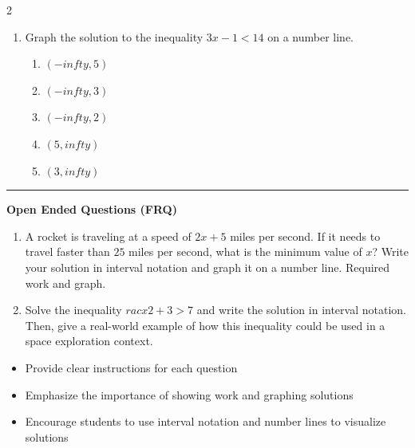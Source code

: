 \documentclass[10pt]{article}
\begin{document}
\begin{multicols}{2}
\begin{enumerate}[label=\textbf{Q\arabic*.}, leftmargin=*, itemsep=6pt, parsep=0pt]
  \item \small Graph the solution to the inequality $3x - 1 < 14$ on a number line.
  \begin{enumerate}[label=(\Alph*), leftmargin=0.6cm, nosep, itemsep=2pt]
    \item $(-infty, 5)$
    \item $(-infty, 3)$
    \item $(-infty, 2)$
    \item $(5, infty)$
    \item $(3, infty)$
  \end{enumerate}

\end{enumerate}
\end{multicols}

\vspace{-0.2cm}
\hrule
\vspace{0.2cm}
\textbf{\small Open Ended Questions (FRQ)}
\begin{enumerate}[label=\textbf{Q\arabic*.}, start=9, itemsep=5pt, topsep=0pt]

  \item \small A rocket is traveling at a speed of $2x + 5$ miles per second. If it needs to travel faster than $25$ miles per second, what is the minimum value of $x$? Write your solution in interval notation and graph it on a number line. Required work and graph. \vspace{2cm}

  \item \small Solve the inequality $rac{x}{2} + 3 > 7$ and write the solution in interval notation. Then, give a real-world example of how this inequality could be used in a space exploration context. \vspace{2cm}

\end{enumerate}

\vfill

\begin{tcolorbox}[colback=blue!5, colframe=mainblue!50, title=\small \textbf{Chef's Tips}, fonttitle=\bfseries, bottom=1mm]
\begin{itemize}[noitemsep, topsep=2pt, leftmargin=0.5cm]
  \item \scriptsize Provide clear instructions for each question\item \scriptsize Emphasize the importance of showing work and graphing solutions\item \scriptsize Encourage students to use interval notation and number lines to visualize solutions
\end{itemize}
\end{tcolorbox}
\end{document}
